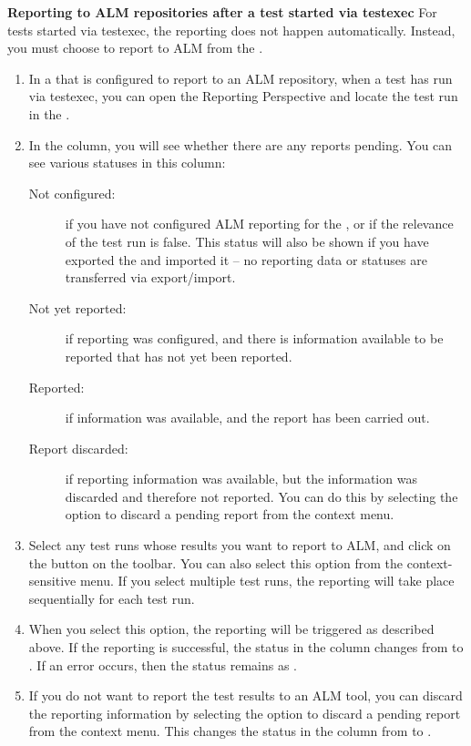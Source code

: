 \textbf{Reporting to ALM repositories after a test started via testexec}
\label{TasksALMReportTestExec}
For tests started via testexec, the reporting does not happen automatically. Instead, you must choose to report to ALM from the \gdtestsummaryview{}.

\begin{enumerate}
\item In a \gdproject{} that is configured to report to an ALM repository, when a test has run via testexec, you can open the Reporting Perspective and locate the test run in the \gdtestsummaryview{}.
\item In the  column, you will see whether there are any reports pending. You can see various statuses in this column:

\begin{description}
\item [Not configured:]{if you have not configured ALM reporting for the \gdproject{}, or if the relevance of the test run is false. This status will also be shown if you have exported the \gdproject{} and imported it -- no reporting data or statuses are transferred via export/import.}
\item [Not yet reported:]{if reporting was configured, and there is information available to be reported that has not yet been reported.}
\item [Reported:]{if information was available, and the report has been carried out.}
\item [Report discarded:]{if reporting information was available, but the information was discarded and therefore not reported. You can do this by selecting the option to discard a pending report from the context menu.}
\end{description}
\item Select any test runs whose results you want to report to ALM, and click on the  button on the toolbar. You can also select this option from the context-sensitive menu. If you select multiple test runs, the reporting will take place sequentially for each test run. 
\item When you select this option, the reporting will be triggered as described above. If the reporting is successful, the status in the  column changes from  to . If an error occurs, then the status remains as . 
\item If you do not want to report the test results to an ALM tool, you can discard the reporting information by selecting the option to discard a pending report from the context menu. This changes the status in the  column  from  to .
\end{enumerate}


